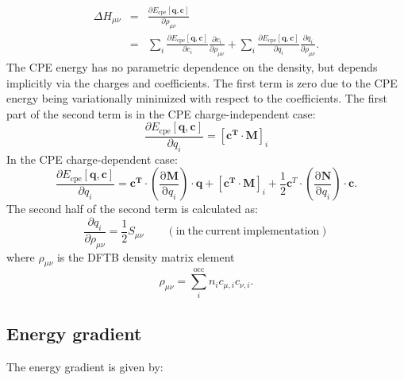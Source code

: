 \documentclass{article}
\numberwithin{equation}{section}
\begin{document}
\begin{eqnarray}
    \Delta H_{\mu\nu} &=& \frac{\partial E_{\mathrm{cpe}}\left[\mathbf{q}, \mathbf{c}\right]}{\partial \rho_{\mu\nu}}\\
    &=& \sum_i \frac{\partial E_{\mathrm{cpe}}\left[\mathbf{q}, \mathbf{c}\right]}{\partial c_i} 
    \frac{\partial c_i}{\partial \rho_{\mu\nu}}
    + \sum_i \frac{\partial E_{\mathrm{cpe}}\left[\mathbf{q}, \mathbf{c}\right]}{\partial q_i} 
    \frac{\partial q_i}{\partial \rho_{\mu\nu}}.
\end{eqnarray}
The CPE energy has no parametric dependence on the density, but depends implicitly via the charges and coefficients.
The first term is zero due to the CPE energy being variationally minimized with respect to the coefficients.
The first part of the second term is in the CPE charge-independent case:
\begin{equation}
    \frac{\partial E_{\mathrm{cpe}}\left[\mathbf{q}, \mathbf{c}\right]}{\partial q_i} = [\mathbf{c^T}  \cdot \mathbf{M}]_i
\end{equation}
In the CPE charge-dependent case:
\begin{equation}
    \frac{\partial E_{\mathrm{cpe}}\left[\mathbf{q}, \mathbf{c}\right]}{\partial q_i} = 
    \mathbf{c^T} \cdot \left( \frac{\mathrm{\partial}\mathbf{M}}{\mathrm{\partial}q_i}\right) \cdot \mathbf{q} 
    + [\mathbf{c^T}  \cdot \mathbf{M}]_i + \frac{1}{2}\mathbf{c}^T \cdot \left( \frac{\mathrm{\partial}\mathbf{N}}{\mathrm{\partial}q_i}\right) \cdot \mathbf{c}. 
\end{equation}
The second half of the second term is calculated as:
\begin{equation}
    \frac{\partial q_i}{\partial \rho_{\mu\nu}} = \frac{1}{2} S_{\mu\nu} \qquad \mathrm{(in~the~current~implementation)}
\end{equation}
where $\rho_{\mu\nu}$ is the DFTB density matrix element
\begin{equation}
    \rho_{\mu\nu} = \sum_i^\mathrm{occ} n_i c_{\mu,i} c_{\nu,i}.
\end{equation}




\subsection{Energy gradient}
The energy gradient is given by:
\end{document}
